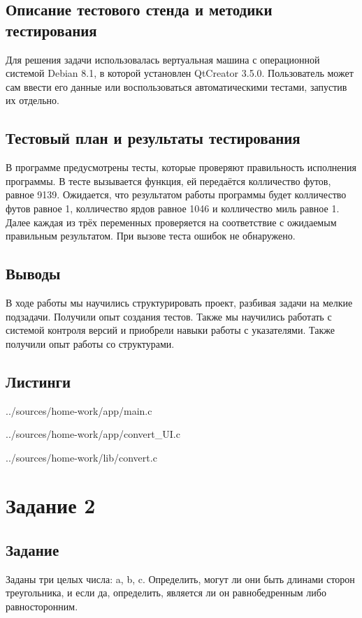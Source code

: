 \documentclass[12pt,a4paper]{report}
\begin{document}
\subsection{Описание тестового стенда и методики тестирования}
Для решения задачи использовалась вертуальная машина с операционной системой Debian 8.1, в которой установлен QtCreator 3.5.0. 
Пользователь может сам ввести его данные или воспользоваться автоматическими тестами, запустив их отдельно.
\subsection{Тестовый план и результаты тестирования}
В программе предусмотрены тесты, которые проверяют правильность исполнения программы. В тесте вызывается функция, ей передаётся колличество футов, равное 9139. Ожидается, что результатом работы программы будет колличество футов равное 1, колличество ярдов равное 1046 и колличество миль равное 1. Далее каждая из трёх переменных проверяется на соответствие с ожидаемым правильным результатом. При вызове теста ошибок не обнаружено.
\subsection{Выводы}
В ходе работы мы научились структурировать проект, разбивая задачи на мелкие подзадачи. Получили опыт создания тестов. Также мы научились работать с системой контроля версий и приобрели навыки работы с указателями. Также получили опыт работы со структурами.
\subsection*{Листинги}

{../sources/home-work/app/main.c}


{../sources/home-work/app/convert_UI.c}


{../sources/home-work/lib/convert.c}


\section{Задание 2}
\subsection{Задание}
Заданы три целых числа: a, b, c. Определить, могут ли они быть длинами сторон треугольника, и если да, определить, является ли он равнобедренным либо равносторонним.
\end{document}

